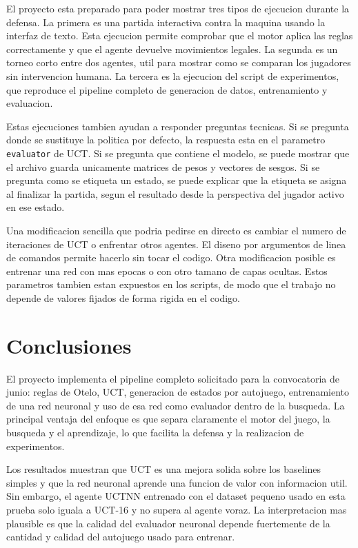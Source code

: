 \documentclass[conference,a4paper]{IEEEtran}
\begin{document}
El proyecto esta preparado para poder mostrar tres tipos de ejecucion durante la
defensa. La primera es una partida interactiva contra la maquina usando la
interfaz de texto. Esta ejecucion permite comprobar que el motor aplica las
reglas correctamente y que el agente devuelve movimientos legales. La segunda es
un torneo corto entre dos agentes, util para mostrar como se comparan los
jugadores sin intervencion humana. La tercera es la ejecucion del script de
experimentos, que reproduce el pipeline completo de generacion de datos,
entrenamiento y evaluacion.

Estas ejecuciones tambien ayudan a responder preguntas tecnicas. Si se pregunta
donde se sustituye la politica por defecto, la respuesta esta en el parametro
\texttt{evaluator} de UCT. Si se pregunta que contiene el modelo, se puede
mostrar que el archivo guarda unicamente matrices de pesos y vectores de sesgos.
Si se pregunta como se etiqueta un estado, se puede explicar que la etiqueta se
asigna al finalizar la partida, segun el resultado desde la perspectiva del
jugador activo en ese estado.

Una modificacion sencilla que podria pedirse en directo es cambiar el numero de
iteraciones de UCT o enfrentar otros agentes. El diseno por argumentos de linea
de comandos permite hacerlo sin tocar el codigo. Otra modificacion posible es
entrenar una red con mas epocas o con otro tamano de capas ocultas. Estos
parametros tambien estan expuestos en los scripts, de modo que el trabajo no
depende de valores fijados de forma rigida en el codigo.

\section{Conclusiones}

El proyecto implementa el pipeline completo solicitado para la convocatoria de
junio: reglas de Otelo, UCT, generacion de estados por autojuego, entrenamiento
de una red neuronal y uso de esa red como evaluador dentro de la busqueda. La
principal ventaja del enfoque es que separa claramente el motor del juego, la
busqueda y el aprendizaje, lo que facilita la defensa y la realizacion de
experimentos.

Los resultados muestran que UCT es una mejora solida sobre los baselines simples
y que la red neuronal aprende una funcion de valor con informacion util. Sin
embargo, el agente UCTNN entrenado con el dataset pequeno usado en esta prueba
solo iguala a UCT-16 y no supera al agente voraz. La interpretacion mas plausible
es que la calidad del evaluador neuronal depende fuertemente de la cantidad y
calidad del autojuego usado para entrenar.
\end{document}
